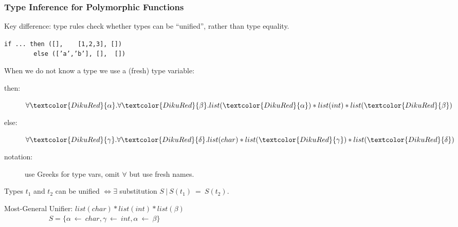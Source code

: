 \documentclass{beamer}
\renewcommand{\emph}[1]{\textcolor{structure}{#1}}
\newcommand{\emp}[1]{\textcolor{DikuRed}{ #1}}
\begin{document}
\begin{frame}[fragile,t]
   \frametitle{Type Inference for Polymorphic Functions}

\bigskip

\emph{Key difference: type rules check whether types can be ``unified'',
rather than type equality.}

\bigskip

{\tt if ... then ([],~~~~[1,2,3], [])}\\
{\tt ~~~~~~~~else (['a','b'], [],~~[])}

\bigskip

When we do not know a type we use a (fresh) \emp{type variable}:\\
\begin{description}
    \item[then:] $\forall\emp{\alpha}.\forall\emp{\beta}.list(\emp{\alpha})*list(int)*list(\emp{\beta})$
    
    \item[else:] $\forall\emp{\gamma}.\forall\emp{\delta}.list(char)*list(\emp{\gamma})*list(\emp{\delta})$

    \item[notation:] use Greeks for type vars, omit $\forall$ but use fresh names.
\end{description}

\bigskip

Types $t_1$ and $t_2$ can be unified $\Leftrightarrow \exists$ substitution $S~|~S(t_1)~=~S(t_2)$.

\bigskip

\emp{Most-General Unifier:} $list(char) * list(int) * list(\beta)$\\
$~~~~~~~~~~~~~~~~~~~~~~~~~~~~S = \{\alpha~\leftarrow~char, \gamma~\leftarrow~int, \alpha~\leftarrow~\beta\}$

\end{frame}
\end{document}
